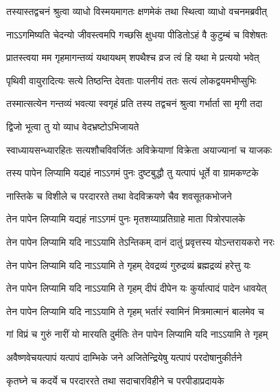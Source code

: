 \twolineshloka
{तस्यास्तद्वचनं श्रुत्वा व्याधो विस्मयमागतः}
{क्षणमेकं तथा स्थित्वा व्याधो वचनमब्रवीत्}%

\twolineshloka
{नाऽऽगमिष्यति चेदन्यो जीव\footnotemark{}स्त्वमपि गच्छसि}
{क्षुधया पीडितोऽहं वै कुटुम्बं च विशेषतः}%

\twolineshloka
{प्रातस्त्वया मम गृहमागन्तव्यं यथायथम्}
{शपथैश्च व्रज त्वं हि यथा मे प्रत्ययो भवेत्}%

\twolineshloka
{पृथिवी वायुरादित्यः सत्ये तिष्ठन्ति देवताः}
{पालनीयं ततः सत्यं लोकद्वयमभीप्सुभिः}%

\twolineshloka
{तस्मात्सत्येन गन्तव्यं भवत्या स्वगृहं प्रति}
{तस्य तद्वचनं श्रुत्वा गर्भार्ता सा मृगी तदा}%



\onelineshloka
{द्विजो भूत्वा तु यो व्याध वेदभ्रष्टोऽभिजायते}%

\twolineshloka
{स्वाध्यायसन्ध्यारहितः सत्यशौचविवर्जितः}
{अविक्रेयाणां विक्रेता अयाज्यानां च याजकः}%

\twolineshloka
{\footnotemark{}तस्य पापेन लिप्यामि यद्यहं नाऽऽगमं पुनः}
{दुष्टबुद्धौ तु यत्पापं धूर्ते वा ग्रामकण्टके}%

\twolineshloka
{नास्तिके च विशीले च परदाररते तथा}
{वेदविक्रयणे चैव शवसूतकभोजने}%

\twolineshloka
{तेन पापेन लिप्यामि यद्यहं नाऽऽगमं पुनः}
{मृतशय्याप्रतिग्राहे माता पित्रोरपालके}%

\twolineshloka
{तेन पापेन लिप्यामि यदि नाऽऽयामि तेऽन्तिकम्}
{दानं दातुं प्रवृत्तस्य योऽन्तरायकरो नरः}%

\twolineshloka
{तेन पापेन लिप्यामि यदि नाऽऽयामि ते गृहम्}
{देवद्रव्यं गुरुद्रव्यं ब्रह्मद्रव्यं हरेत्तु यः}%

\twolineshloka
{तेन पापेन लिप्यामि यदि नाऽऽयामि ते गृहम्}
{दीपं दीपेन यः कुर्यात्पादं पादेन धावयेत्}%

\twolineshloka
{तेन पापेन लिप्यामि यदि नाऽऽयामि ते गृहम्}
{भर्तारं स्वामिनं मित्रमात्मानं बालमेव च}%

\twolineshloka
{गां विप्रं च गुरुं नारीं यो मारयति दुर्मतिः}
{तेन पापेन लिप्यामि यदि नाऽऽयामि ते गृहम्}%

\twolineshloka
{अवैष्णवेचयत्पापं यत्पापं दाम्भिके जने}
{अजितेन्द्रियेषु यत्पापं परदोषानुकीर्तने}%

\twolineshloka
{कृतघ्ने च कदर्ये च परदाररते तथा}
{सदाचारविहीने च परपीडाप्रदायके}%

